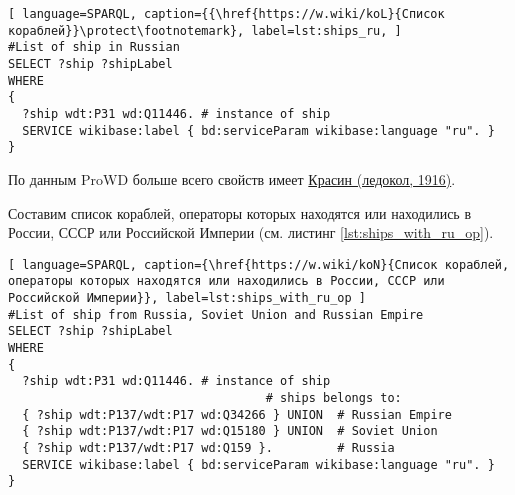 \begin{lstlisting}[ language=SPARQL, caption={{\href{https://w.wiki/koL}{Список кораблей}}\protect\footnotemark}, label=lst:ships_ru, ]
#List of ship in Russian
SELECT ?ship ?shipLabel
WHERE
{
  ?ship wdt:P31 wd:Q11446. # instance of ship
  SERVICE wikibase:label { bd:serviceParam wikibase:language "ru". }
}
\end{lstlisting}

По данным ProWD больше всего свойств имеет \href{https://www.wikidata.org/wiki/Q281147}{Красин (ледокол, 1916)}\cite{ProWD_ru_ships}.

Составим список кораблей, операторы которых находятся или находились в России, СССР или Российской Империи (см. листинг \ref{lst:ships_with_ru_op}).

\begin{lstlisting}[ language=SPARQL, caption={\href{https://w.wiki/koN}{Cписок кораблей, операторы которых находятся или находились в России, СССР или Российской Империи}}, label=lst:ships_with_ru_op ]
#List of ship from Russia, Soviet Union and Russian Empire
SELECT ?ship ?shipLabel
WHERE
{
  ?ship wdt:P31 wd:Q11446. # instance of ship
                                    # ships belongs to:
  { ?ship wdt:P137/wdt:P17 wd:Q34266 } UNION  # Russian Empire
  { ?ship wdt:P137/wdt:P17 wd:Q15180 } UNION  # Soviet Union
  { ?ship wdt:P137/wdt:P17 wd:Q159 }.         # Russia
  SERVICE wikibase:label { bd:serviceParam wikibase:language "ru". }
}
\end{lstlisting}




